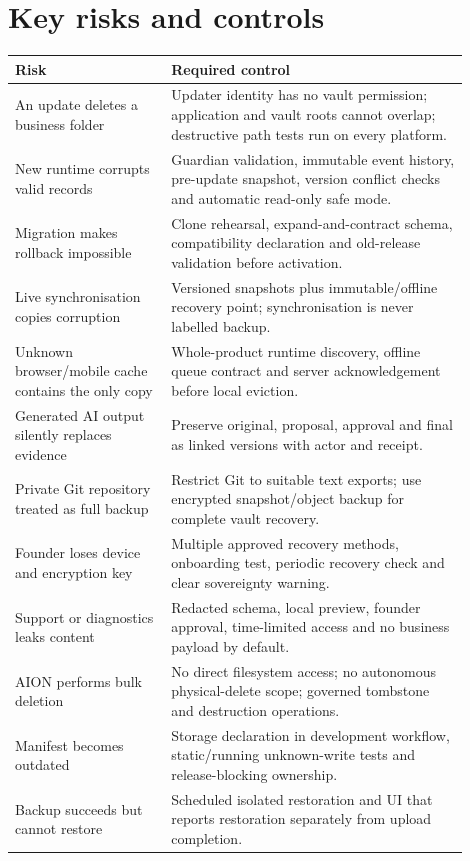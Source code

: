 \documentclass[11pt]{article}
\begin{document}
\section{Key risks and controls}

\begin{longtable}{p{0.31\linewidth} p{0.59\linewidth}}
\toprule
Risk & Required control \\
\midrule
An update deletes a business folder & Updater identity has no vault permission; application and vault roots cannot overlap; destructive path tests run on every platform. \\
New runtime corrupts valid records & Guardian validation, immutable event history, pre-update snapshot, version conflict checks and automatic read-only safe mode. \\
Migration makes rollback impossible & Clone rehearsal, expand-and-contract schema, compatibility declaration and old-release validation before activation. \\
Live synchronisation copies corruption & Versioned snapshots plus immutable/offline recovery point; synchronisation is never labelled backup. \\
Unknown browser/mobile cache contains the only copy & Whole-product runtime discovery, offline queue contract and server acknowledgement before local eviction. \\
Generated AI output silently replaces evidence & Preserve original, proposal, approval and final as linked versions with actor and receipt. \\
Private Git repository treated as full backup & Restrict Git to suitable text exports; use encrypted snapshot/object backup for complete vault recovery. \\
Founder loses device and encryption key & Multiple approved recovery methods, onboarding test, periodic recovery check and clear sovereignty warning. \\
Support or diagnostics leaks content & Redacted schema, local preview, founder approval, time-limited access and no business payload by default. \\
AION performs bulk deletion & No direct filesystem access; no autonomous physical-delete scope; governed tombstone and destruction operations. \\
Manifest becomes outdated & Storage declaration in development workflow, static/running unknown-write tests and release-blocking ownership. \\
Backup succeeds but cannot restore & Scheduled isolated restoration and UI that reports restoration separately from upload completion. \\
\bottomrule
\end{longtable}
\end{document}
